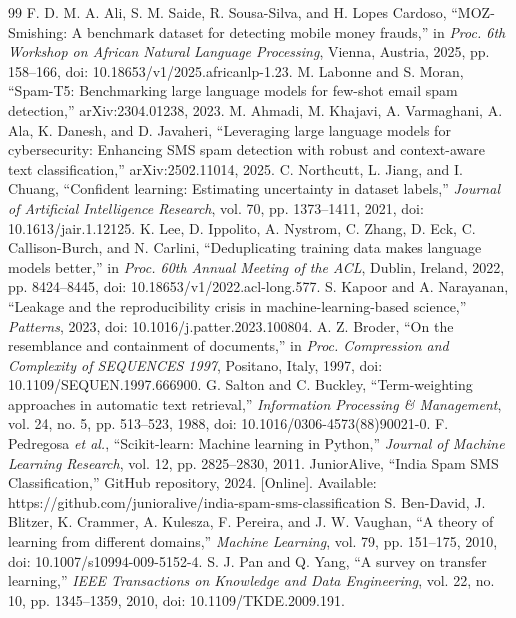 \begin{thebibliography}{99}
 F. D. M. A. Ali, S. M. Saide, R. Sousa-Silva, and H. Lopes Cardoso, ``MOZ-Smishing: A benchmark dataset for detecting mobile money frauds,'' in \textit{Proc. 6th Workshop on African Natural Language Processing}, Vienna, Austria, 2025, pp. 158--166, doi: 10.18653/v1/2025.africanlp-1.23.
 M. Labonne and S. Moran, ``Spam-T5: Benchmarking large language models for few-shot email spam detection,'' arXiv:2304.01238, 2023.
 M. Ahmadi, M. Khajavi, A. Varmaghani, A. Ala, K. Danesh, and D. Javaheri, ``Leveraging large language models for cybersecurity: Enhancing SMS spam detection with robust and context-aware text classification,'' arXiv:2502.11014, 2025.
 C. Northcutt, L. Jiang, and I. Chuang, ``Confident learning: Estimating uncertainty in dataset labels,'' \textit{Journal of Artificial Intelligence Research}, vol. 70, pp. 1373--1411, 2021, doi: 10.1613/jair.1.12125.
 K. Lee, D. Ippolito, A. Nystrom, C. Zhang, D. Eck, C. Callison-Burch, and N. Carlini, ``Deduplicating training data makes language models better,'' in \textit{Proc. 60th Annual Meeting of the ACL}, Dublin, Ireland, 2022, pp. 8424--8445, doi: 10.18653/v1/2022.acl-long.577.
 S. Kapoor and A. Narayanan, ``Leakage and the reproducibility crisis in machine-learning-based science,'' \textit{Patterns}, 2023, doi: 10.1016/j.patter.2023.100804.
 A. Z. Broder, ``On the resemblance and containment of documents,'' in \textit{Proc. Compression and Complexity of SEQUENCES 1997}, Positano, Italy, 1997, doi: 10.1109/SEQUEN.1997.666900.
 G. Salton and C. Buckley, ``Term-weighting approaches in automatic text retrieval,'' \textit{Information Processing \& Management}, vol. 24, no. 5, pp. 513--523, 1988, doi: 10.1016/0306-4573(88)90021-0.
 F. Pedregosa \textit{et al.}, ``Scikit-learn: Machine learning in Python,'' \textit{Journal of Machine Learning Research}, vol. 12, pp. 2825--2830, 2011.
 JuniorAlive, ``India Spam SMS Classification,'' GitHub repository, 2024. [Online]. Available: https://github.com/junioralive/india-spam-sms-classification
 S. Ben-David, J. Blitzer, K. Crammer, A. Kulesza, F. Pereira, and J. W. Vaughan, ``A theory of learning from different domains,'' \textit{Machine Learning}, vol. 79, pp. 151--175, 2010, doi: 10.1007/s10994-009-5152-4.
 S. J. Pan and Q. Yang, ``A survey on transfer learning,'' \textit{IEEE Transactions on Knowledge and Data Engineering}, vol. 22, no. 10, pp. 1345--1359, 2010, doi: 10.1109/TKDE.2009.191.

\end{thebibliography}
